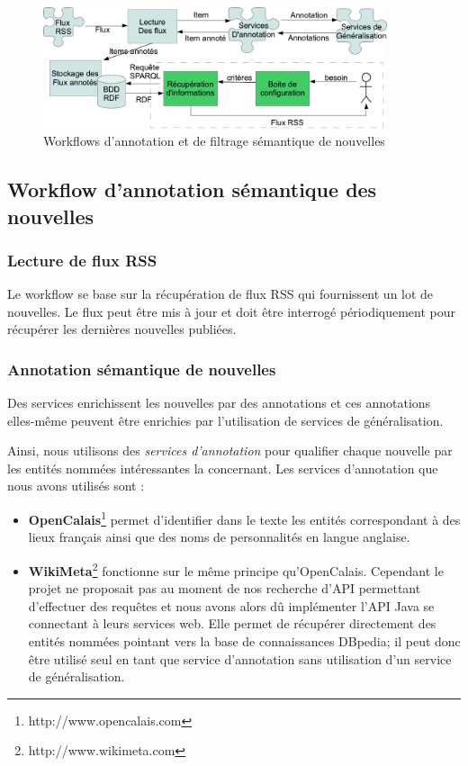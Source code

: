 \documentclass[]{easychair}
\begin{document}
\begin{figure}[htb!]
	\begin{centering}
	\includegraphics[width=0.9\textwidth]{diagramme-Archi.png}
	\caption{Workflows d'annotation et de filtrage sémantique de nouvelles}
	\label{fig:WF}
	\end{centering}
\end{figure}

\subsection{Workflow d'annotation sémantique des nouvelles}

\subsubsection{Lecture de flux RSS}
Le workflow se base sur la récupération de flux RSS qui fournissent un lot de nouvelles. Le flux peut être mis à jour et doit être interrogé périodiquement pour récupérer les dernières nouvelles publiées.

\subsubsection{Annotation sémantique de nouvelles}
Des services enrichissent les nouvelles par des annotations et ces annotations elles-même peuvent être enrichies par l'utilisation de services de généralisation. 

Ainsi, nous utilisons des \textit{services d'annotation} pour qualifier chaque nouvelle par les entités nommées intéressantes la concernant. Les services d'annotation que nous avons utilisés sont : 
\begin{itemize}
	\item \textbf{OpenCalais}\footnote{http://www.opencalais.com} permet d'identifier dans le texte les entités correspondant à des lieux français ainsi que des noms de personnalités en langue anglaise. 
  \item \textbf{WikiMeta}\footnote{http://www.wikimeta.com} fonctionne sur le même principe qu'OpenCalais. Cependant le projet ne proposait pas au moment de nos recherche d'API permettant d'effectuer des requêtes et nous avons alors dû implémenter l'API Java se connectant à leurs services web. Elle permet de récupérer directement des entités nommées pointant vers la base de connaissances DBpedia; il peut donc être utilisé seul en tant que service d'annotation sans utilisation d'un service de généralisation.
\end{itemize}
\end{document}
